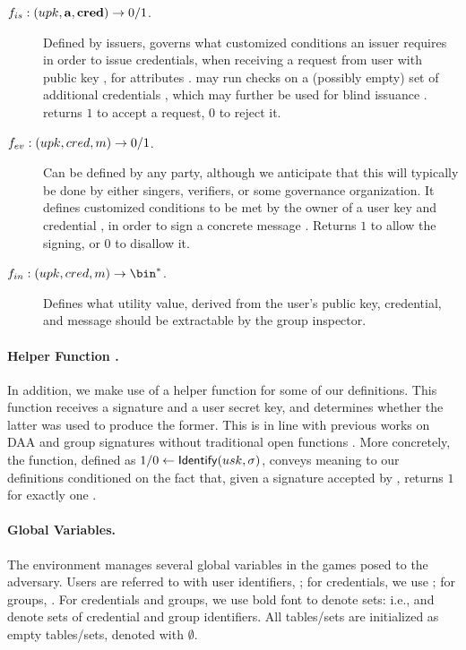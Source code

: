 \begin{description}
\item[$f_{is}: (upk, \mathbf{a},\mathbf{cred}) \rightarrow 0/1$.] Defined by issuers,
  governs what customized conditions an issuer requires in order to issue
  credentials, when receiving a request from user with public key \upk, for
  attributes \attrs. \fissue may run checks on a (possibly empty) set of
  additional credentials \scred, which may further be used for blind issuance
  . \fissue returns $1$ to accept a request, $0$ to
  reject it.  
\item[$f_{ev}: (upk,cred,m) \rightarrow 0/1$.] Can be defined by any party,
  although we anticipate that this will typically be done by either singers,
  verifiers, or some governance organization. It defines customized conditions
  to be met by the owner of a user key \upk and credential \cred, in
  order to sign a concrete message \msg. Returns $1$ to allow the signing,
  or $0$ to disallow it.
\item[$\finsp: (\upk,\cred,\msg) \rightarrow \bin^*$.] Defines what
  utility value, derived from the user's public key, credential, and message
  should be extractable by the group inspector.
\end{description}

\paragraph{Helper Function \Identify.} In addition, we make use of a helper
function \Identify for some of our definitions. This function receives
a signature and a user secret key, and determines whether the latter was used
to produce the former. This is in line with previous works on DAA
\cite{bfg+11,cdl16} and group signatures without traditional open functions
\cite{dl21,fgl21,gl19}. More concretely, the \Identify function, defined as $1/0
\gets \mathsf{Identify}(usk,\sigma)$, conveys meaning to our definitions conditioned on
the fact that, given a signature \sig accepted by \Verify, \Identify returns $1$
for exactly one \usk.

\paragraph{Global Variables.} %
The environment manages several global variables in the games posed to the
adversary. Users are referred to with user identifiers, \uid; for credentials,
we use \cid; for groups, \gid. For credentials and groups, we use bold font to
denote sets: i.e., \scid and \sgid denote sets of credential and group
identifiers. All tables/sets are initialized as empty tables/sets, denoted
with $\emptyset$.

